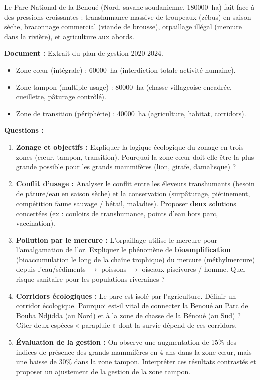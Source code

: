 \documentclass[11pt]{article}
\begin{document}
\begin{exercice}
Le Parc National de la Benoué (Nord, savane soudanienne, \SI{180 000}{\hectare}) fait face à des pressions croissantes : transhumance massive de troupeaux (zébus) en saison sèche, braconnage commercial (viande de brousse), orpaillage illégal (mercure dans la rivière), et agriculture aux abords.

\textbf{Document :} Extrait du plan de gestion 2020-2024.
\begin{itemize}
    \item Zone cœur (intégrale) : \SI{60 000}{\hectare} (interdiction totale activité humaine).
    \item Zone tampon (multiple usage) : \SI{80 000}{\hectare} (chasse villageoise encadrée, cueillette, pâturage contrôlé).
    \item Zone de transition (périphérie) : \SI{40 000}{\hectare} (agriculture, habitat, corridors).
\end{itemize}

\textbf{Questions :}
\begin{enumerate}
    \item \textbf{Zonage et objectifs :} Expliquer la logique écologique du zonage en trois zones (cœur, tampon, transition). Pourquoi la zone cœur doit-elle être la plus grande possible pour les grands mammifères (lion, girafe, damalisque) ?
    \item \textbf{Conflit d'usage :} Analyser le conflit entre les éleveurs transhumants (besoin de pâture/eau en saison sèche) et la conservation (surpâturage, piétinement, compétition faune sauvage / bétail, maladies). Proposer \textbf{deux} solutions concertées (ex : couloirs de transhumance, points d'eau hors parc, vaccination).
    \item \textbf{Pollution par le mercure :} L'orpaillage utilise le mercure pour l'amalgamation de l'or. Expliquer le phénomène de \textbf{bioamplification} (bioaccumulation le long de la chaîne trophique) du mercure (méthylmercure) depuis l'eau/sédiments $\rightarrow$ poissons $\rightarrow$ oiseaux piscivores / homme. Quel risque sanitaire pour les populations riveraines ?
    \item \textbf{Corridors écologiques :} Le parc est isolé par l'agriculture. Définir un corridor écologique. Pourquoi est-il vital de connecter la Benoué au Parc de Bouba Ndjidda (au Nord) et à la zone de chasse de la Bénoué (au Sud) ? Citer deux espèces « parapluie » dont la survie dépend de ces corridors.
    \item \textbf{Évaluation de la gestion :} On observe une augmentation de \num{15}\% des indices de présence des grands mammifères en 4 ans dans la zone cœur, mais une baisse de \num{30}\% dans la zone tampon. Interpréter ces résultats contrastés et proposer un ajustement de la gestion de la zone tampon.
\end{enumerate}
\end{exercice}
\end{document}
